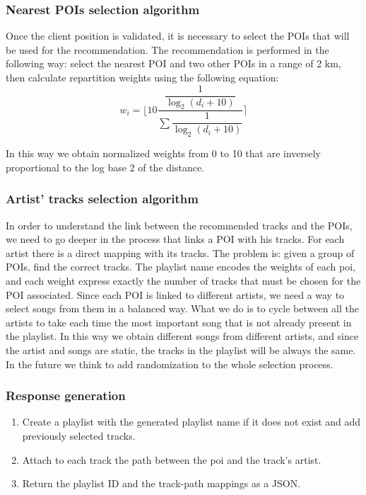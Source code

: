\documentclass[paper=a4, fontsize=11pt]{scrartcl}
\begin{document}
\subsubsection{Nearest POIs selection algorithm}
Once the client position is validated, it is necessary to select the POIs that will be used for the recommendation. 
The recommendation is performed in the following way: select the nearest POI and two other POIs in a range of 2 km, then calculate repartition weights using the following equation:
$$w_i = \Bigg \lfloor 10 \dfrac{\dfrac{1}{\log_2 (d_i + 10)}}{\sum \dfrac{1}{\log_2 (d_i + 10)} } \Bigg \rceil$$

In this way we obtain normalized weights from 0 to 10 that are inversely proportional to the log base 2 of the distance. 

\subsubsection{Artist' tracks selection algorithm}
In order to understand the link between the recommended tracks and the POIs, we need to go deeper in the process that links a POI with his tracks.
For each artist there is a direct mapping with its tracks.
The problem is: given a group of POIs, find the correct tracks.
The playlist name encodes the weights of each poi, and each weight express exactly the number of tracks that must be chosen for the POI associated.
Since each POI is linked to different artists, we need a way to select songs from them in a balanced way.
What we do is to cycle between all the artists to take each time the most important song that is not already present in the playlist. In this way we obtain different songs from different artists, and since the artist and songs are static, the tracks in the playlist will be always the same. In the future we think to add randomization to the whole selection process.

\subsubsection{Response generation}
\begin{enumerate}
\item Create a playlist with the generated playlist name if it does not exist and add previously selected tracks.
\item Attach to each track the path between the poi and the track's artist.
\item Return the playlist ID and the track-path mappings as a JSON.
\end{enumerate}
\end{document}
